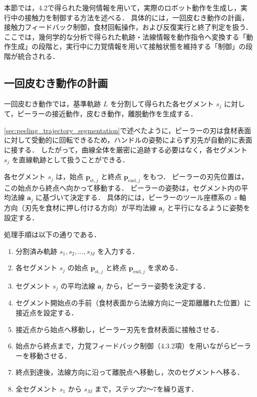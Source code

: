 本節では，4.2で得られた幾何情報を用いて，実際のロボット動作を生成し，実行中の接触力を制御する方法を述べる．
具体的には，一回皮むき動作の計画，接触力フィードバック制御，食材回転操作，および反復実行と終了判定を扱う．
ここでは，幾何学的な分析で得られた軌跡・法線情報を動作指令へ変換する「動作生成」の段階と，実行中に力覚情報を用いて接触状態を維持する「制御」の段階が統合される．

\subsection{一回皮むき動作の計画}
\label{sec:peeling_one_peel_motion}

一回皮むき動作では，基準軌跡 $L$ を分割して得られた各セグメント $s_j$ に対して，ピーラーの接近動作，皮むき動作，離脱動作を生成する．

\ref{sec:peeling_trajectory_segmentation}で述べたように，ピーラーの刃は食材表面に対して受動的に回転できるため，ハンドルの姿勢によらず刃先が自動的に表面に接する．
したがって，曲線全体を厳密に追跡する必要はなく，各セグメント $s_j$ を直線軌跡として扱うことができる．

各セグメント $s_j$ は，始点 $\mathbf{p}_{\mathrm{st},j}$ と終点 $\mathbf{p}_{\mathrm{end},j}$ をもつ．
ピーラーの刃先位置は，この始点から終点へ向かって移動する．
ピーラーの姿勢は，セグメント内の平均法線 $\mathbf{a}_j$ に基づいて決定する．
具体的には，ピーラーのツール座標系の $z$ 軸方向（刃先を食材に押し付ける方向）が平均法線 $\mathbf{a}_j$ と平行になるように姿勢を設定する．

処理手順は以下の通りである．

\begin{enumerate}
  \item 分割済み軌跡 $s_1, s_2, \ldots, s_M$ を入力する．
  \item 各セグメント $s_j$ の始点 $\mathbf{p}_{\mathrm{st},j}$ と終点 $\mathbf{p}_{\mathrm{end},j}$ を求める．
  \item セグメント $s_j$ の平均法線 $\mathbf{a}_j$ から，ピーラー姿勢を決定する．
  \item セグメント開始点の手前（食材表面から法線方向に一定距離離れた位置）に接近点を設定する．
  \item 接近点から始点へ移動し，ピーラー刃先を食材表面に接触させる．
  \item 始点から終点まで，力覚フィードバック制御（4.3.2項）を用いながらピーラーを移動させる．
  \item 終点到達後，法線方向に沿って離脱点へ移動し，次のセグメントへ移る．
  \item 全セグメント $s_1$ から $s_M$ まで，ステップ2〜7を繰り返す．
\end{enumerate}

